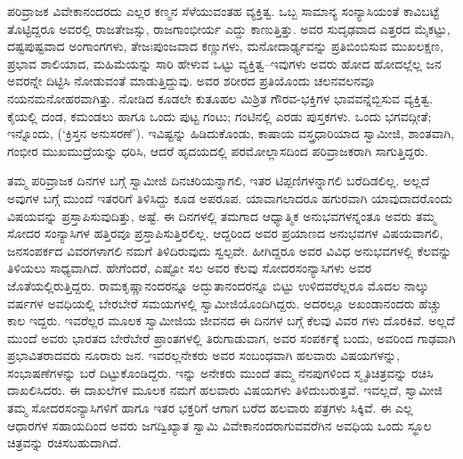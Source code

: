 ಪರಿವ್ರಾಜಕ ವಿವೇಕಾನಂದರದು ಎಲ್ಲರ ಕಣ್ಮನ ಸೆಳೆಯುವಂತಹ ವ್ಯಕ್ತಿತ್ವ. ಒಬ್ಬ ಸಾಮಾನ್ಯ ಸಂನ್ಯಾಸಿಯಂತೆ ಕಾವಿಬಟ್ಟೆ ತೊಟ್ಟಿದ್ದರೂ ಅವರಲ್ಲಿ ರಾಜತೇಜಸ್ಸು, ರಾಜಗಾಂಭೀರ್ಯ ಎದ್ದು ಕಾಣುತ್ತಿತ್ತು. ಅವರ ಸುದೃಢವಾದ ಎತ್ತರದ ಮೈಕಟ್ಟು, ದಷ್ಟಪುಷ್ಟವಾದ ಅಂಗಾಂಗಗಳು, ತೇಜಃಪುಂಜವಾದ ಕಣ್ಣುಗಳು, ಮನೋದಾರ್ಢ್ಯವನ್ನು ಪ್ರತಿಬಿಂಬಿಸುವ ಮುಖಲಕ್ಷಣ, ಪ್ರಭಾವ ಶಾಲಿಯಾದ, ಮಹಿಮೆಯನ್ನು ಸಾರಿ ಹೇಳುವ ಒಟ್ಟು ವ್ಯಕ್ತಿತ್ವ–ಇವುಗಳು ಅವರು ಹೋದ ಹೋದಲ್ಲೆಲ್ಲ ಜನ ಅವರನ್ನೇ ದಿಟ್ಟಿಸಿ ನೋಡುವಂತೆ ಮಾಡುತ್ತಿದ್ದುವು. ಅವರ ಶರೀರದ ಪ್ರತಿಯೊಂದು ಚಲನವಲನವೂ ನಯನಮನೋಹರವಾಗಿತ್ತು. ನೋಡಿದ ಕೂಡಲೇ ಕುತೂಹಲ ಮಿಶ್ರಿತ ಗೌರವ-ಭಕ್ತಿಗಳ ಭಾವವನ್ನೆಬ್ಬಿಸುವ ವ್ಯಕ್ತಿತ್ವ. ಕೈಯಲ್ಲಿ ದಂಡ, ಕಮಂಡಲು ಹಾಗೂ ಒಂದು ಪುಟ್ಟ ಗಂಟು; ಗಂಟಿನಲ್ಲಿ ಎರಡು ಪುಸ್ತಕಗಳು. ಒಂದು ಭಗವದ್ಗೀತೆ; ಇನ್ನೊಂದು,  (‘ಕ್ರಿಸ್ತನ ಅನುಸರಣೆ’). ಇವಿಷ್ಟನ್ನು ಹಿಡಿದುಕೊಂಡು, ಕಾಷಾಯ ವಸ್ತ್ರಧಾರಿಯಾದ ಸ್ವಾಮೀಜಿ, ಶಾಂತವಾಗಿ, ಗಂಭೀರ ಮುಖಮುದ್ರೆಯನ್ನು ಧರಿಸಿ, ಆದರೆ ಹೃದಯದಲ್ಲಿ ಪರಮೋಲ್ಲಾಸದಿಂದ ಪರಿವ್ರಾಜಕರಾಗಿ ಸಾಗುತ್ತಿದ್ದರು.

ತಮ್ಮ ಪರಿವ್ರಾಜಕ ದಿನಗಳ ಬಗ್ಗೆ ಸ್ವಾಮೀಜಿ ದಿನಚರಿಯನ್ನಾಗಲಿ, ಇತರ ಟಿಪ್ಪಣಿಗಳನ್ನಾಗಲಿ ಬರೆದಿಡಲಿಲ್ಲ. ಅಲ್ಲದೆ ಅವುಗಳ ಬಗ್ಗೆ ಮುಂದೆ ಇತರರಿಗೆ ತಿಳಿಸಿದ್ದು ಕೂಡ ಅಪರೂಪ. ಯಾವಾಗಲಾದರೂ ಹಗುರವಾಗಿ ಯಾವುದಾದರೊಂದು ವಿಷಯವನ್ನು ಪ್ರಸ್ತಾಪಿಸುವುದಿತ್ತು, ಅಷ್ಟೆ. ಈ ದಿನಗಳಲ್ಲಿ ತಮಗಾದ ಆಧ್ಯಾತ್ಮಿಕ ಅನುಭವಗಳನ್ನಂತೂ ಅವರು ತಮ್ಮ ಸೋದರ ಸಂನ್ಯಾಸಿಗಳ ಹತ್ತಿರವೂ ಪ್ರಸ್ತಾಪಿಸುತ್ತಿರಲಿಲ್ಲ. ಆದ್ದರಿಂದ ಅವರ ಪ್ರಯಾಣದ ಅನುಭವಗಳ ವಿಷಯವಾಗಲಿ, ಜನಸಂಪರ್ಕದ ವಿವರಗಳಾಗಲಿ ನಮಗೆ ತಿಳಿದಿರುವುದು ಸ್ವಲ್ಪವೇ. ಹೀಗಿದ್ದರೂ ಅವರ ವಿವಿಧ ಅನುಭವಗಳಲ್ಲಿ ಕೆಲವನ್ನು ತಿಳಿಯಲು ಸಾಧ್ಯವಾಗಿದೆ. ಹೇಗೆಂದರೆ, ಎಷ್ಟೋ ಸಲ ಅವರ ಕೆಲವು ಸೋದರಸಂನ್ಯಾಸಿಗಳು ಅವರ ಜೊತೆಯಲ್ಲಿರುತ್ತಿದ್ದರು. ರಾಮಕೃಷ್ಣಾನಂದರನ್ನೂ ಅದ್ಭುತಾನಂದರನ್ನೂ ಬಿಟ್ಟು ಉಳಿದವರೆಲ್ಲರೂ ಮೊದಲ ನಾಲ್ಕು ವರ್ಷಗಳ ಅವಧಿಯಲ್ಲಿ ಬೇರಬೇರೆ ಸಮಯಗಳಲ್ಲಿ ಸ್ವಾಮೀಜಿಯೊಂದಿಗಿದ್ದರು. ಅದರಲ್ಲೂ ಅಖಂಡಾನಂದರು ಹೆಚ್ಚು ಕಾಲ ಇದ್ದರು. ಇವರೆಲ್ಲರ ಮೂಲಕ ಸ್ವಾಮೀಜಿಯ ಜೀವನದ ಈ ದಿನಗಳ ಬಗ್ಗೆ ಕೆಲವು ವಿವರ ಗಳು ದೊರಕಿವೆ. ಅಲ್ಲದೆ ಮುಂದೆ ಅವರು ಭಾರತದ ಬೇರೆಬೇರೆ ಪ್ರಾಂತಗಳಲ್ಲಿ ತಿರುಗಾಡುವಾಗ, ಅವರ ಸಂಪರ್ಕಕ್ಕೆ ಬಂದು, ಅವರಿಂದ ಗಾಢವಾಗಿ ಪ್ರಭಾವಿತರಾದವರು ನೂರಾರು ಜನ. ಇವರಲ್ಲನೇಕರು ಅವರ ಸಂಬಂಧವಾಗಿ ಹಲವಾರು ವಿಷಯಗಳನ್ನು, ಸಂಭಾಷಣೆಗಳನ್ನು ಬರೆ ದಿಟ್ಟುಕೊಂಡಿದ್ದರು. ಇನ್ನು ಅನೇಕರು ಮುಂದೆ ತಮ್ಮ ನೆನಪುಗಳಿಂದ ಸ್ಮೃತಿಚಿತ್ರವನ್ನು ರಚಿಸಿ ದಾಖಲಿಸಿದರು. ಈ ದಾಖಲೆಗಳ ಮೂಲಕ ನಮಗೆ ಹಲವಾರು ವಿಷಯಗಳು ತಿಳಿದುಬರುತ್ತವೆ. ಇವಲ್ಲದೆ, ಸ್ವಾಮೀಜಿ ತಮ್ಮ ಸೋದರಸಂನ್ಯಾಸಿಗಳಿಗೆ ಹಾಗೂ ಇತರ ಭಕ್ತರಿಗೆ ಆಗಾಗ ಬರೆದ ಹಲವಾರು ಪತ್ರಗಳು ಸಿಕ್ಕಿವೆ. ಈ ಎಲ್ಲ ಆಧಾರಗಳ ಸಹಾಯದಿಂದ ಅವರು ಜಗದ್ವಿಖ್ಯಾತ ಸ್ವಾಮಿ ವಿವೇಕಾನಂದರಾಗುವವರೆಗಿನ ಅವಧಿಯ ಒಂದು ಸ್ಥೂಲ ಚಿತ್ರವನ್ನು ರಚಿಸಬಹುದಾಗಿದೆ.


